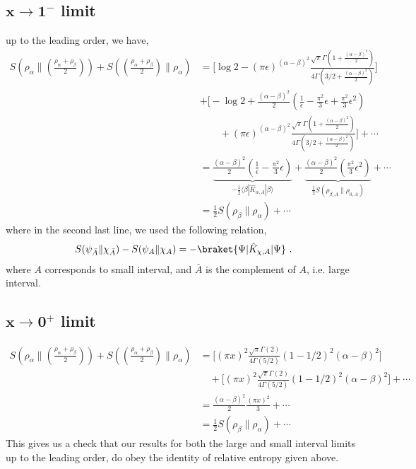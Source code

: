 \documentclass[11pt]{article}
\newcommand{\ep}{\epsilon}
\newcommand{\nn}{\nonumber}
\newcommand{\lb}{\left(}
\newcommand{\rb}{\right)}
\begin{document}
\subsection{\texorpdfstring{$\mathbf{x\to 1^-}$ limit}{x to 1 limit}}
up to the leading order, we have,
\begin{align}
    S\lb \rho_\alpha \Big\| \lb\frac{\rho_\alpha + \rho_\beta}{2}\rb\rb + S\lb \lb\frac{\rho_\alpha + \rho_\beta}{2}\rb \Big\| \rho_\alpha\rb  &= \Bigg[\log 2 - (\pi \ep)^{(\alpha - \beta)^2} \frac{\sqrt{\pi }\Gamma\lb1+ \frac{(\alpha - \beta)^2}{2} \rb}{4\Gamma\lb3/2 + \frac{(\alpha - \beta)^2}{2}\rb } \Bigg] \nn \\
    &+ \Bigg[ -\log 2 + \frac{(\alpha-\beta)^2}{2}\lb \frac{1}{\ep} - \frac{\pi^2}{3}\ep+ \frac{\pi^2}{3}\ep^2\rb \nn\\ &\qquad + \lb\pi \ep\rb^{(\alpha-\beta)^2} \frac{\sqrt \pi \Gamma\lb1+\frac{(\alpha-\beta)^2}{2}\rb}{4\Gamma\lb3/2 + \frac{(\alpha-\beta)^2}{2}\rb}\Bigg] +\cdots \\
    &=  \underbrace{\frac{(\alpha-\beta)^2}{2}\lb\frac{1}{\ep} - \frac{\pi^2}{3}\ep\rb}_{-\frac{1}{2}\langle\beta|{\hat{K}_{\alpha,A}}|\beta\rangle} +  \underbrace{\frac{(\alpha-\beta)^2}{2} \lb   \frac{\pi^2}{3}\ep^2\rb}_{\frac{1}{2}S(\rho_{\beta,A}\|\rho_{0,A})}+ \cdots \\
    &= \frac{1}{2} S(\rho_\beta \| \rho_\alpha) + \cdots
\end{align}
where in the second last line, we used the following relation,
\begin{align}
   S(\psi_{\bar{A}}\|\chi_{\bar{A}})-S(\psi_A\|\chi_A)= -\braket{\Psi|\hat{K}_{\chi,A}|\Psi}\ .
\end{align}
where $A$ corresponds to small interval, and $\bar{A}$ is the complement of $A$, i.e. large interval.

\subsection{\texorpdfstring{$\mathbf{x\to 0^+}$ limit}{x to 0 limit}}
\begin{align}
    S\lb \rho_\alpha \Big\| \lb\frac{\rho_\alpha + \rho_\beta}{2}\rb\rb + S\lb \lb\frac{\rho_\alpha + \rho_\beta}{2}\rb \Big\| \rho_\alpha\rb  &= \Bigg[(\pi x)^{2}\frac{\sqrt{\pi}\Gamma(2)}{4\Gamma(5/2)}(1-1/2)^2(\alpha-\beta)^{2}\Bigg] \nn\\&\quad + \Bigg[(\pi x)^{2}\frac{\sqrt{\pi}\Gamma(2)}{4\Gamma(5/2)}(1-1/2)^2(\alpha-\beta)^{2}\Bigg]+ \cdots \\
    &= \frac{(\alpha-\beta)^2}{2} \frac{(\pi x)^2}{3} +\cdots\\
    &= \frac{1}{2} S(\rho_\beta \| \rho_\alpha) + \cdots
\end{align}
This gives us a check that our results for both the large and small interval limits up to the leading order, do obey the identity of relative entropy given above. 
\end{document}

